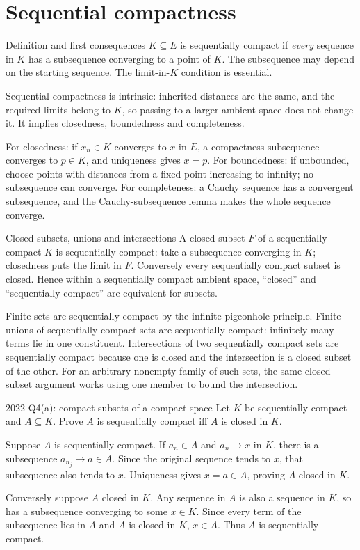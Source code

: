 \clearpage
\setcounter{section}{5}
\section{Sequential compactness}

\begin{note}{Definition and first consequences}
$K\subseteq E$ is sequentially compact if \emph{every} sequence in $K$ has a subsequence converging to a point of $K$. The subsequence may depend on the starting sequence. The limit-in-$K$ condition is essential.

Sequential compactness is intrinsic: inherited distances are the same, and the required limits belong to $K$, so passing to a larger ambient space does not change it. It implies closedness, boundedness and completeness.

For closedness: if $x_n\in K$ converges to $x$ in $E$, a compactness subsequence converges to $p\in K$, and uniqueness gives $x=p$. For boundedness: if unbounded, choose points with distances from a fixed point increasing to infinity; no subsequence can converge. For completeness: a Cauchy sequence has a convergent subsequence, and the Cauchy-subsequence lemma makes the whole sequence converge.
\end{note}
\begin{note}{Closed subsets, unions and intersections}
A closed subset $F$ of a sequentially compact $K$ is sequentially compact: take a subsequence converging in $K$; closedness puts the limit in $F$. Conversely every sequentially compact subset is closed. Hence within a sequentially compact ambient space, ``closed'' and ``sequentially compact'' are equivalent for subsets.

Finite sets are sequentially compact by the infinite pigeonhole principle. Finite unions of sequentially compact sets are sequentially compact: infinitely many terms lie in one constituent. Intersections of two sequentially compact sets are sequentially compact because one is closed and the intersection is a closed subset of the other. For an arbitrary nonempty family of such sets, the same closed-subset argument works using one member to bound the intersection.
\end{note}
\begin{exam}{2022 Q4(a): compact subsets of a compact space}
Let $K$ be sequentially compact and $A\subseteq K$. Prove $A$ is sequentially compact iff $A$ is closed in $K$.
\end{exam}
\begin{answer}
Suppose $A$ is sequentially compact. If $a_n\in A$ and $a_n\to x$ in $K$, there is a subsequence $a_{n_j}\to a\in A$. Since the original sequence tends to $x$, that subsequence also tends to $x$. Uniqueness gives $x=a\in A$, proving $A$ closed in $K$.

Conversely suppose $A$ closed in $K$. Any sequence in $A$ is also a sequence in $K$, so has a subsequence converging to some $x\in K$. Since every term of the subsequence lies in $A$ and $A$ is closed in $K$, $x\in A$. Thus $A$ is sequentially compact.
\end{answer}

